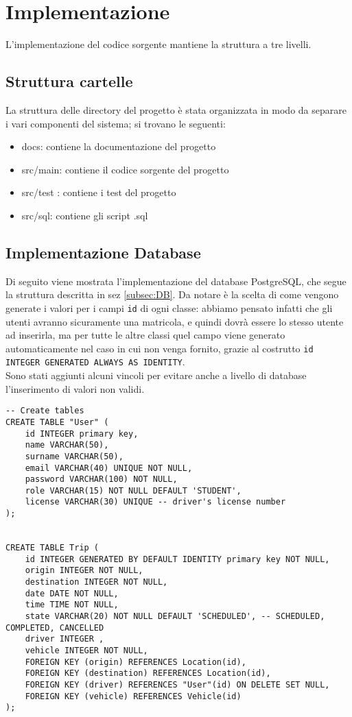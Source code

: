 \section{Implementazione}

L'implementazione del codice sorgente mantiene la struttura a tre livelli.
\subsection{Struttura cartelle}
La struttura delle directory del progetto è stata organizzata in modo da separare i vari componenti del sistema; si trovano le seguenti:
\begin{itemize}
    \item docs: contiene la documentazione del progetto
    \item src/main: contiene il codice sorgente del progetto
    \item src/test : contiene i test del progetto
    \item src/sql: contiene gli script .sql
\end{itemize}

\subsection{Implementazione Database}\label{subsec:DBimpl}
Di seguito viene mostrata l'implementazione del database PostgreSQL, che segue la struttura descritta in sez \ref{subsec:DB}.
Da notare è la scelta di come vengono generate i valori per i campi \texttt{id} di ogni classe: abbiamo pensato infatti che gli utenti avranno sicuramente una matricola, e quindi dovrà essere lo stesso utente ad inserirla, ma per tutte le altre classi quel campo viene generato automaticamente nel caso in cui non venga fornito, grazie al costrutto \texttt{id INTEGER GENERATED ALWAYS AS IDENTITY}.\\
Sono stati aggiunti alcuni vincoli per evitare anche a livello di database l'inserimento di valori non validi.

\begin{lstlisting}[style=sql, caption={Esempio creazione tabelle User e Trip}]
-- Create tables
CREATE TABLE "User" (
    id INTEGER primary key, 
    name VARCHAR(50),
    surname VARCHAR(50),
    email VARCHAR(40) UNIQUE NOT NULL,
    password VARCHAR(100) NOT NULL, 
    role VARCHAR(15) NOT NULL DEFAULT 'STUDENT',
    license VARCHAR(30) UNIQUE -- driver's license number
);


CREATE TABLE Trip (
    id INTEGER GENERATED BY DEFAULT IDENTITY primary key NOT NULL,
    origin INTEGER NOT NULL,
    destination INTEGER NOT NULL,
    date DATE NOT NULL,
    time TIME NOT NULL,
    state VARCHAR(20) NOT NULL DEFAULT 'SCHEDULED', -- SCHEDULED, COMPLETED, CANCELLED
    driver INTEGER , 
    vehicle INTEGER NOT NULL,
    FOREIGN KEY (origin) REFERENCES Location(id),
    FOREIGN KEY (destination) REFERENCES Location(id),
    FOREIGN KEY (driver) REFERENCES "User"(id) ON DELETE SET NULL,
    FOREIGN KEY (vehicle) REFERENCES Vehicle(id)
);
\end{lstlisting}
